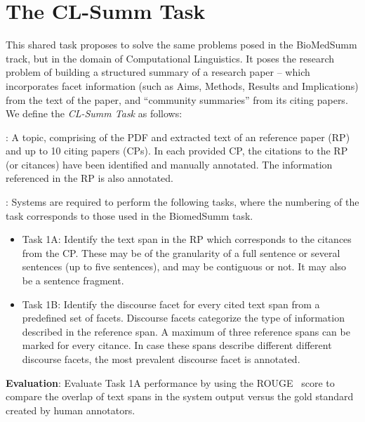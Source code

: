 \documentclass[11pt]{article}
\begin{document}

\section{The CL-Summ Task}
This shared task proposes to solve the same problems posed in the BioMedSumm track, but in the 
domain of Computational Linguistics. It poses the research problem of building a structured 
summary of a research paper -- which incorporates facet information (such as Aims, Methods, 
Results and Implications) from the text of the paper, and ``community summaries'' from its 
citing papers. \\

\noindent We define the {\it CL-Summ Task} as follows:

: A topic, comprising of the PDF and extracted
text of an reference paper (RP) and up to 10 citing papers (CPs).  In
each provided CP, the citations to the RP (or citances) have been
identified and manually annotated. The information referenced in the
RP is also annotated.

: Systems are required to perform the following
tasks, where the numbering of the task corresponds to those used in
the BiomedSumm task.

\begin{itemize}
\item Task 1A: Identify the text span in the RP which corresponds to the citances from the CP. 
  These may be of the granularity of a full   sentence or several sentences (up to five sentences), 
  and may be contiguous or not. It may also be a sentence fragment.
\vspace{-.3cm}
\item Task 1B: Identify the discourse facet for every cited text span from a predefined set of 
  facets. Discourse facets categorize the type of information described in the reference span. 
  A maximum of three reference spans can be marked for every citance. In case these spans describe 
  different different discourse facets, the most prevalent discourse facet is annotated.
\end{itemize}

{\bf Evaluation}: Evaluate Task 1A performance by using the ROUGE~\cite{Lin:2004} score to 
compare the overlap of text spans in the system output versus the gold standard created by 
human annotators.
\end{document}
